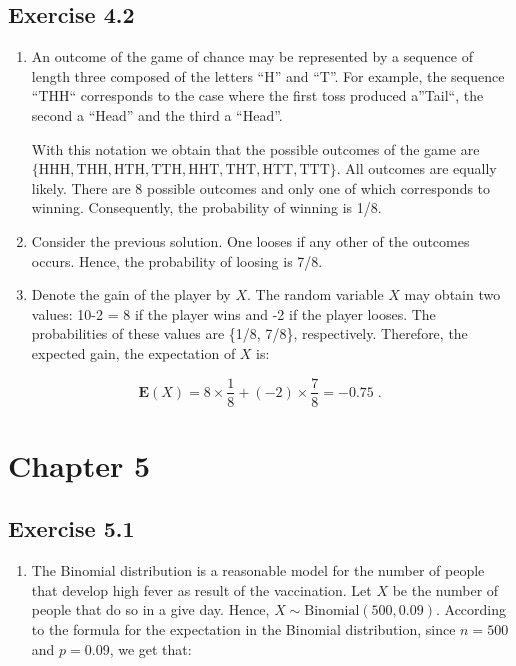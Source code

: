 \documentclass[]{krantz}
\providecommand{\tightlist}{%
  \setlength{\itemsep}{0pt}\setlength{\parskip}{0pt}}
\newcommand{\Expec}{\mathbf{E}}
\theoremstyle{definition}
\theoremstyle{definition}
\theoremstyle{definition}
\theoremstyle{remark}
\begin{document}
\hypertarget{exercise-4.2}{%
\subsection*{Exercise 4.2}\label{exercise-4.2}}


\begin{enumerate}
\def\labelenumi{\arabic{enumi}.}
\item
  An outcome of the game of chance
  may be represented by a sequence of length three composed of the letters
  ``H'' and ``T''. For example, the sequence ``THH`` corresponds to the case
  where the first toss produced a''Tail``, the second a ``Head'' and the
  third a ``Head''.

  With this notation we obtain that the possible outcomes of the game are
  \(\{\mbox{HHH}, \mbox{THH},\mbox{HTH}, \mbox{TTH},\mbox{HHT}, \mbox{THT},\mbox{HTT}, \mbox{TTT}\}\). All outcomes are equally likely. There are 8 possible outcomes and only
  one of which corresponds to winning. Consequently, the probability of winning is 1/8.
\item
  Consider the previous solution.
  One looses if any other of the outcomes occurs. Hence, the probability
  of loosing is 7/8.
\item
  Denote the gain of the player by
  \(X\). The random variable \(X\) may obtain two values: 10-2 = 8 if the
  player wins and -2 if the player looses. The probabilities of these
  values are \{1/8, 7/8\}, respectively. Therefore, the expected gain, the
  expectation of \(X\) is:
\end{enumerate}

\[\Expec(X) = 8 \times \frac{1}{8} + (-2) \times \frac{7}{8} =-0.75\;.\]

\hypertarget{chapter-5}{%
\section*{Chapter 5}\label{chapter-5}}


\hypertarget{exercise-5.1}{%
\subsection*{Exercise 5.1}\label{exercise-5.1}}


\begin{enumerate}
\def\labelenumi{\arabic{enumi}.}
\tightlist
\item
  The Binomial distribution is a
  reasonable model for the number of people that develop high fever as
  result of the vaccination. Let \(X\) be the number of people that do so in
  a give day. Hence, \(X \sim \mbox{Binomial}(500,0.09)\). According to the
  formula for the expectation in the Binomial distribution, since \(n=500\)
  and \(p=0.09\), we get that:
\end{enumerate}
\end{document}
